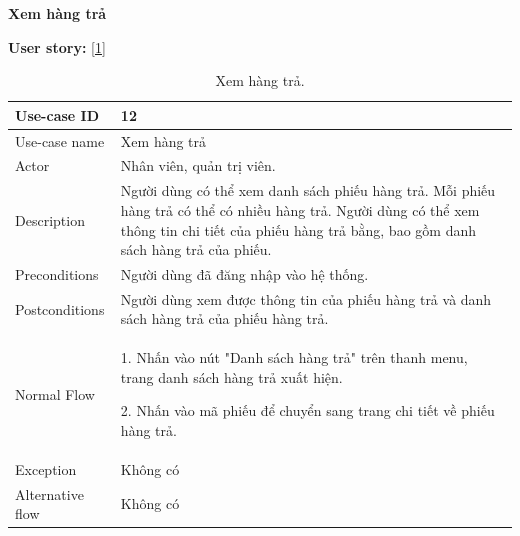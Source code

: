 \textbf{Xem hàng trả}\par
\textbf{User story:} [\ref{bang12}]
\begin{table}[!htp]
    \centering
    \begin{tabular}{|m{3cm}|m{10cm}|}
    \hline 
        Use-case ID & 12\\ \hline
        Use-case name & Xem hàng trả\\ \hline
        Actor & Nhân viên, quản trị viên.\\ \hline
        Description & Người dùng có thể xem danh sách phiếu hàng trả. Mỗi phiếu hàng trả có thể có nhiều hàng trả. Người dùng có thể xem thông tin chi tiết của phiếu hàng trả bằng, bao gồm danh sách hàng trả của phiếu.\\ \hline
        Preconditions & Người dùng đã đăng nhập vào hệ thống.\\ \hline
        Postconditions & Người dùng xem được thông tin của phiếu hàng trả và danh sách hàng trả của phiếu hàng trả.\\ \hline
        Normal Flow & 
        1. Nhấn vào nút "Danh sách hàng trả" trên thanh menu, trang danh sách hàng trả xuất hiện.\par
        2. Nhấn vào mã phiếu để chuyển sang trang chi tiết về phiếu hàng trả.
        \\ \hline
        Exception & Không có\\ \hline
        Alternative flow & Không có\\ 
    \hline 
    \end{tabular}
    \caption{Xem hàng trả.}
    \label{bang12}
\end{table}

